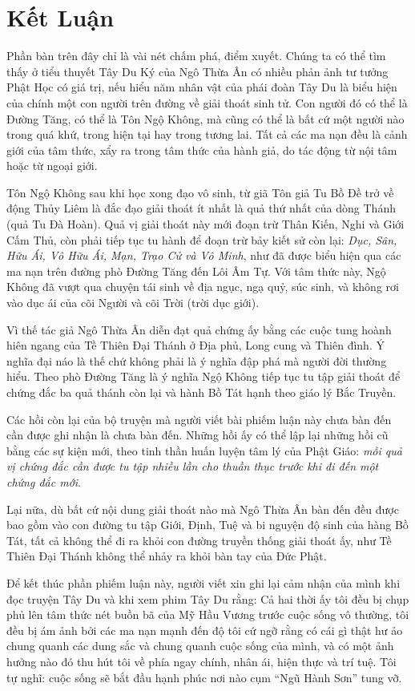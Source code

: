 \chapter{Kết Luận} %
\label{cha:ket_luan}

Phần bàn trên đây chỉ là vài nét chấm phá, điểm xuyết. Chúng ta có thể tìm thấy ở tiểu thuyết Tây Du Ký của Ngô Thừa Ân có nhiều phản ảnh tư tưởng Phật Học có giá trị, nếu hiểu năm nhân vật của phái đoàn Tây Du là biểu hiện của chính một con người trên đường về giải thoát sinh tử. Con người đó có thể là Đường Tăng, có thể là Tôn Ngộ Không, mà cũng có thể là bất cứ một người nào trong quá khứ, trong hiện tại hay trong tương lai. Tất cả các ma nạn đều là cảnh giới của tâm thức, xẩy ra trong tâm thức của hành giả, do tác động từ nội tâm hoặc từ ngoại giới.

Tôn Ngộ Không sau khi học xong đạo vô sinh, từ giã Tôn giả Tu Bồ Đề trở về động Thủy Liêm là đắc đạo giải thoát ít nhất là quả thứ nhất của dòng Thánh (quả Tu Đà Hoàn). Quả vị giải thoát này mới đoạn trừ Thân Kiến, Nghi và Giới Cấm Thủ, còn phải tiếp tục tu hành để đoạn trừ bảy kiết sử còn lại: \emph{Dục, Sân, Hữu Ái, Vô Hữu Ái, Mạn, Trạo Cử và Vô Minh}, như đã được biểu hiện qua các ma nạn trên đường phò Đường Tăng đến Lôi Âm Tự. Với tâm thức này, Ngộ Không đã vượt qua chuyện tái sinh về địa ngục, ngạ quỷ, súc sinh, và không rơi vào dục ái của cõi Người và cõi Trời (trời dục giới).

Vì thế tác giả Ngô Thừa Ân diễn đạt quả chứng ấy bằng các cuộc tung hoành hiên ngang của Tề Thiên Đại Thánh ở Địa phủ, Long cung và Thiên đình. Ý nghĩa đại náo là thế chứ không phải là ý nghĩa đập phá mà người đời thường hiểu. Theo phò Đường Tăng là ý nghĩa Ngộ Không tiếp tục tu tập giải thoát để chứng đắc ba quả thánh còn lại và hành Bồ Tát hạnh theo giáo lý Bắc Truyền.

Các hồi còn lại của bộ truyện mà người viết bài phiếm luận này chưa bàn đến cần được ghi nhận là chưa bàn đến. Những hồi ấy có thể lập lại những hồi cũ bằng các sự kiện mới, theo tinh thần huấn luyện tâm lý của Phật Giáo: \emph{mỗi quả vị chứng đắc cần được tu tập nhiều lần cho thuần thục trước khi đi đến một chứng đắc mới}.

Lại nữa, dù bất cứ nội dung giải thoát nào mà Ngô Thừa Ân bàn đến đều được bao gồm vào con đường tu tập Giới, Định, Tuệ và bi nguyện độ sinh của hàng Bồ Tát, tất cả không thể đi ra khỏi con đường truyền thống giải thoát ấy, như Tề Thiên Đại Thánh không thể nhảy ra khỏi bàn tay của Đức Phật.

Để kết thúc phần phiếm luận này, người viết xin ghi lại cảm nhận của mình khi đọc truyện Tây Du và khi xem phim Tây Du rằng: Cả hai thời ấy tôi đều bị chụp phủ lên tâm thức nét buồn bã của Mỹ Hầu Vương trước cuộc sống vô thường, tôi đều bị ám ảnh bởi các ma nạn mạnh đến độ tôi cứ ngỡ rằng có cái gì thật hư ảo chung quanh các dung sắc và chung quanh cuộc sống của mình, và có một ảnh hưởng nào đó thu hút tôi về phía ngay chính, nhân ái, hiện thực và trí tuệ. Tôi tự nghĩ: cuộc sống sẽ bắt đầu hạnh phúc nơi nào cụm ``Ngũ Hành Sơn'' tung vỡ.
